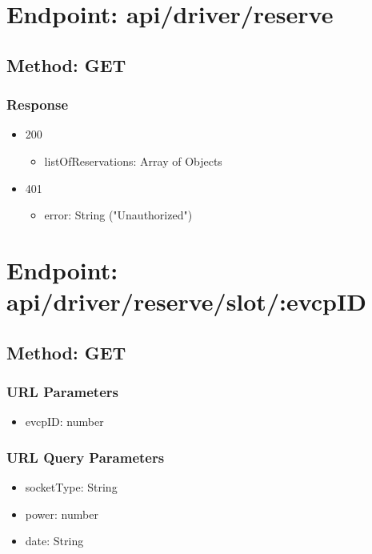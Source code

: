 \section*{Endpoint: api/driver/reserve}
\subsection*{Method: GET}
\subsubsection*{Response}
\begin{itemize}
    \item 200
          \begin{itemize}
              \item listOfReservations: Array of Objects
          \end{itemize}
    \item 401
          \begin{itemize}
              \item error: String ("Unauthorized")
          \end{itemize}
\end{itemize}

\section*{Endpoint: api/driver/reserve/slot/:evcpID}
\subsection*{Method: GET}
\subsubsection*{URL Parameters}
\begin{itemize}
    \item evcpID: number
\end{itemize}
\subsubsection*{URL Query Parameters}
\begin{itemize}
    \item socketType: String
    \item power: number
    \item date: String
\end{itemize}
